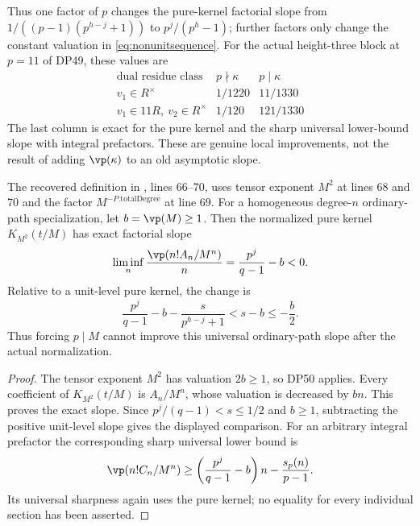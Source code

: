 Thus one factor of $p$ changes the pure-kernel factorial slope from
$1/((p-1)(p^{h-j}+1))$ to $p^j/(p^h-1)$; further factors only change the constant valuation in \eqref{eq:nonunitsequence}.
For the actual height-three block at $p=11$ of DP49, these values are
\[
\begin{array}{c|c|c}
\text{dual residue class}&p\nmid\kappa&p\mid\kappa\\\hline
v_1\in R^\times&1/1220&11/1330\\
v_1\in11R,\ v_2\in R^\times&1/120&121/1330
\end{array}
\]
The last column is exact for the pure kernel and the sharp universal lower-bound slope with integral prefactors. These are genuine local improvements, not the result of adding $\vp(\kappa)$ to an old asymptotic slope.

\begin{corollary}
The recovered definition  in
, lines 66--70, uses tensor exponent $M^2$ at lines 68 and 70 and the factor $M^{-P.\mathrm{totalDegree}}$ at line 69.
For a homogeneous degree-$n$ ordinary-path specialization, let $b=\vp(M)\ge1$.
Then the normalized pure kernel $K_{M^2}(t/M)$ has exact factorial slope
\[
 \liminf_n\frac{\vp(n!A_n/M^n)}n
       =\frac{p^j}{q-1}-b<0.
\]
Relative to a unit-level pure kernel, the change is
\[
 \frac{p^j}{q-1}-b-\frac{s}{p^{h-j}+1}
       <s-b\le-\frac b2.
\]
Thus forcing $p\mid M$ cannot improve this universal ordinary-path slope after the actual normalization.
\end{corollary}

\begin{proof}
The tensor exponent $M^2$ has valuation $2b\ge1$, so DP50 applies.
Every coefficient of $K_{M^2}(t/M)$ is $A_n/M^n$, whose valuation is decreased by $bn$.
This proves the exact slope.
Since $p^j/(q-1)<s\le1/2$ and $b\ge1$, subtracting the positive unit-level slope gives the displayed comparison.
For an arbitrary integral prefactor the corresponding sharp universal lower bound is
\[
 \vp(n!C_n/M^n)
       \ge\left(\frac{p^j}{q-1}-b\right)n
           -\frac{s_p(n)}{p-1}.
\]
Its universal sharpness again uses the pure kernel; no equality for every individual section has been asserted.
\end{proof}


